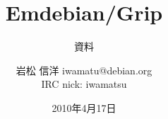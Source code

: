 




\documentclass[cjk,dvipdfmx,12pt]{beamer}
\usepackage{monthlypresentation}



\title{Emdebian/Grip}
\subtitle{資料}
\author{岩松 信洋 iwamatu@debian.org\\IRC nick: iwamatsu}
\date{2010年4月17日}



